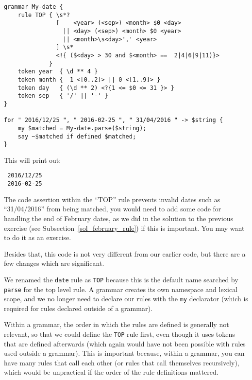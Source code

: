 \label{dategrammar}
\begin{verbatim}
grammar My-date {
    rule TOP { \s*? 
               [    <year> (<sep>) <month> $0 <day>
                 || <day> (<sep>) <month> $0 <year> 
                 || <month>\s<day>',' <year>                     
               ] \s* 
               <!{ ($<day> > 30 and $<month> ==  2|4|6|9|11)}>  
             }
    token year  { \d ** 4 }                                        
    token month {  1 <[0..2]> || 0 <[1..9]> }                
    token day   { (\d ** 2) <?{1 <= $0 <= 31 }> }  
    token sep   { '/' || '-' } 
}                         

for " 2016/12/25 ", " 2016-02-25 ", " 31/04/2016 " -> $string {
	my $matched = My-date.parse($string);
	say ~$matched if defined $matched;
}
\end{verbatim}

This will print out:
\begin{verbatim}
 2016/12/25
 2016-02-25
\end{verbatim}

The code assertion within the ``TOP'' rule prevents invalid 
dates such as ``31/04/2016'' from being matched, you would 
need to add some code for handling the end of February dates,
as we did in the solution to the previous exercise (see 
Subsection~\ref{sol_february_rule}) if this is important. You may 
want to do it as an exercise.

Besides that, this code is not very different from our 
earlier code, but there are a few changes which are 
significant.


We renamed the {\tt date} rule as {\tt TOP} because this 
is the default name searched by {\tt parse} for the top level 
rule. A grammar creates its own namespace and 
lexical scope, and we no longer need to declare our rules 
with the {\tt my} declarator (which is required for
rules declared outside of a grammar). 

Within a grammar, the order in which the rules are 
defined is generally not relevant, so that we could define 
the {\tt TOP} rule first, even though it uses tokens 
that are defined afterwards (which again would have not 
been possible with rules used outside a grammar). This is 
important because, within a grammar, you can have many rules 
that call each other (or rules that call themselves 
recursively), which would be unpractical if the order of 
the rule definitions mattered.



